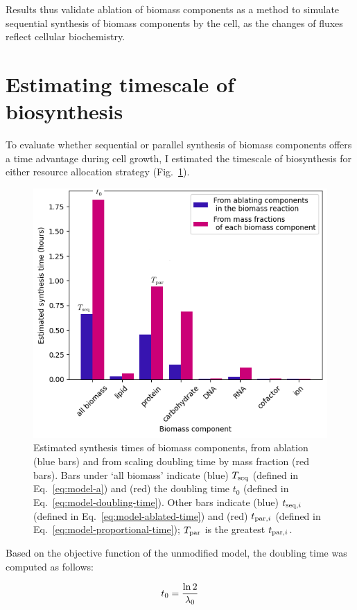 Results thus validate ablation of biomass components as a method to simulate sequential synthesis of biomass components by the cell, as the changes of fluxes reflect cellular biochemistry.


\section{Estimating timescale of biosynthesis}
\label{sec:model-timescale}

To evaluate whether sequential or parallel synthesis of biomass components offers a time advantage during cell growth, I estimated the timescale of biosynthesis for either resource allocation strategy (Fig.\ \ref{fig:model-ablate-times}).

\begin{figure}
  \centering
  \includegraphics[width=.7\linewidth]{ablation_example_adapted.png}
  \caption[
    Estimated synthesis times of biomass components, from ablation and from scaling doubling time by mass fraction.
  ]{
    Estimated synthesis times of biomass components, from ablation (blue bars) and from scaling doubling time by mass fraction (red bars).
    Bars under `all biomass' indicate (blue) $T_{\mathrm{seq}}$ (defined in Eq.\ \ref{eq:model-a}) and (red) the doubling time $t_{0}$ (defined in Eq.\ \ref{eq:model-doubling-time}).
    Other bars indicate (blue) $t_{\mathrm{seq},i}$ (defined in Eq.\ \ref{eq:model-ablated-time}) and (red) $t_{\mathrm{par},i}$ (defined in Eq.\ \ref{eq:model-proportional-time}); $T_{\mathrm{par}}$ is the greatest $t_{\mathrm{par},i}$.
  }
  \label{fig:model-ablate-times}
\end{figure}

Based on the objective function of the unmodified model, the doubling time was computed as follows:

\begin{equation}
  t_{0} = \frac{\ln 2}{\lambda_{0}}
  \label{eq:model-doubling-time}
\end{equation}


